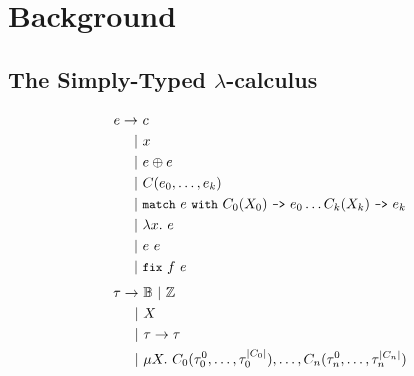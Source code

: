 \section{Background}
\label{s:background}

\subsection{The Simply-Typed $\lambda$-calculus}
\label{sec:stlc}
\begin{figure*}[t]
  \begin{floatrow}[2]
    {  \begin{align*}
        e \rightarrow &\ c \\
        | &\ x \\
        | &\ e \oplus e \\
        | &\ C(e_0, \ldots, e_k) \\
        | &\ \cc{match}\ e\ \cc{with}\ C_0(X_0)\ \cc{->}\ e_0 %
        \ldots %
        C_k(X_k)\ \cc{->}\ e_k \\
        | &\ \lambda x.\ e \\
        | &\ e\ e \\
        | &\ \fix{ f }{ e }
      \end{align*} }
    { \begin{align*} %
        \tau \rightarrow &\ \bools\ |\ \ints \\
        | &\ X \\
        | &\ \tau \rightarrow \tau \\
        | &\ \mu X.\ C_0(\tau_0^0, \ldots, \tau_0^{\arityof{C_0}}), %
        \ldots, C_n(\tau_n^0, \ldots, \tau_n^{\arityof{C_n}})
      \end{align*} }
  \end{floatrow}
\end{figure*}

